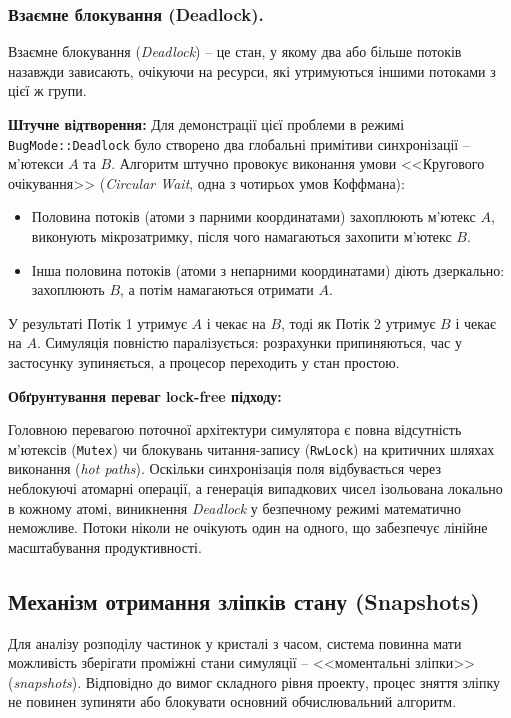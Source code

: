 \documentclass[14pt, a4paper]{extreport}
\begin{document}
	\subsubsection{Взаємне блокування (Deadlock).}
	
	Взаємне блокування (\textit{Deadlock}) -- це стан, у якому два або більше потоків назавжди зависають, очікуючи на ресурси, які утримуються іншими потоками з цієї ж групи. 
	
	\textbf{Штучне відтворення:}
	Для демонстрації цієї проблеми в режимі \texttt{BugMode::Deadlock} було створено два глобальні примітиви синхронізації -- м'ютекси $A$ та $B$. Алгоритм штучно провокує виконання умови <<Кругового очікування>> (\textit{Circular Wait}, одна з чотирьох умов Коффмана):
	\begin{itemize}
		\item Половина потоків (атоми з парними координатами) захоплюють м'ютекс $A$, виконують мікрозатримку, після чого намагаються захопити м'ютекс $B$.
		\item Інша половина потоків (атоми з непарними координатами) діють дзеркально: захоплюють $B$, а потім намагаються отримати $A$.
	\end{itemize}
	
	У результаті Потік 1 утримує $A$ і чекає на $B$, тоді як Потік 2 утримує $B$ і чекає на $A$. Симуляція повністю паралізується: розрахунки припиняються, час у застосунку зупиняється, а процесор переходить у стан простою.
	
	\textbf{Обґрунтування переваг lock-free підходу:}
	
	Головною перевагою поточної архітектури симулятора є повна відсутність м'ютексів (\texttt{Mutex}) чи блокувань читання-запису (\texttt{RwLock}) на критичних шляхах виконання (\textit{hot paths}). Оскільки синхронізація поля відбувається через неблокуючі атомарні операції, а генерація випадкових чисел ізольована локально в кожному атомі, виникнення \textit{Deadlock} у безпечному режимі математично неможливе. Потоки ніколи не очікують один на одного, що забезпечує лінійне масштабування продуктивності.
	
	\subsection{Механізм отримання зліпків стану (Snapshots)}
	
	Для аналізу розподілу частинок у кристалі з часом, система повинна мати можливість зберігати проміжні стани симуляції -- <<моментальні зліпки>> (\textit{snapshots}). Відповідно до вимог складного рівня проекту, процес зняття зліпку не повинен зупиняти або блокувати основний обчислювальний алгоритм.
	
\end{document}
